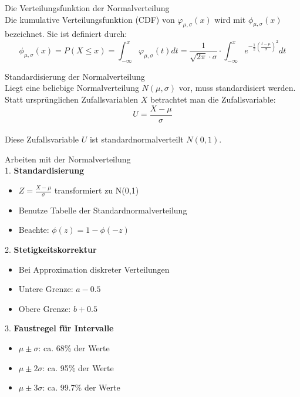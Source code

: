 \begin{definition}{Die Verteilungsfunktion der Normalverteilung}\\
Die kumulative Verteilungsfunktion (CDF) von $\varphi_{\mu,\sigma}(x)$ wird mit $\phi_{\mu,\sigma}(x)$ bezeichnet. Sie ist definiert durch:
\vspace{-2mm}\\
$$
\phi_{\mu,\sigma}(x) = P(X \leq x) = \int_{-\infty}^x \varphi_{\mu,\sigma}(t)dt = \frac{1}{\sqrt{2\pi} \cdot \sigma} \cdot \int_{-\infty}^x e^{-\frac{1}{2}(\frac{t-\mu}{\sigma})^2} dt
$$
\end{definition}

\begin{concept}{Standardisierung der Normalverteilung} \\
Liegt eine beliebige Normalverteilung $N(\mu,\sigma)$ vor, muss standardisiert werden. Statt ursprünglichen Zufallsvariablen $X$ betrachtet man die Zufallsvariable:
\vspace{-4mm}\\
$$
U = \frac{X-\mu}{\sigma}
$$
\vspace{-2mm}\\
Diese Zufallsvariable $U$ ist standardnormalverteilt $N(0,1)$.
\end{concept}

\begin{KR}{Arbeiten mit der Normalverteilung}\\
1. \textbf{Standardisierung}
   \begin{itemize}
   \item $Z = \frac{X-\mu}{\sigma}$ transformiert zu N(0,1)
   \item Benutze Tabelle der Standardnormalverteilung
   \item Beachte: $\phi(z) = 1 - \phi(-z)$
   \end{itemize}

2. \textbf{Stetigkeitskorrektur}
   \begin{itemize}
   \item Bei Approximation diskreter Verteilungen
   \item Untere Grenze: $a - 0.5$
   \item Obere Grenze: $b + 0.5$
   \end{itemize}

3. \textbf{Faustregel für Intervalle}
   \begin{itemize}
   \item $\mu \pm \sigma$: ca. 68\% der Werte
   \item $\mu \pm 2\sigma$: ca. 95\% der Werte
   \item $\mu \pm 3\sigma$: ca. 99.7\% der Werte
   \end{itemize}
\end{KR}

